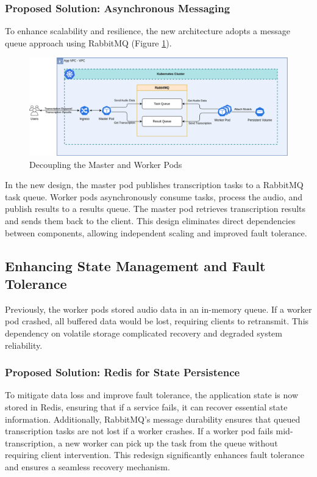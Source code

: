 \subsubsection{Proposed Solution: Asynchronous Messaging}
To enhance scalability and resilience, the new architecture adopts a message queue approach using RabbitMQ (Figure \ref{fig:decouple}).
\begin{figure}[!ht]
    \centering
    \includegraphics[width=\textwidth]{figures/decouple.drawio.png}
    \caption{Decoupling the Master and Worker Pods}
    \label{fig:decouple}
\end{figure}

In the new design, the master pod publishes transcription tasks to a RabbitMQ task queue. Worker pods asynchronously consume tasks, process the audio, and publish results to a results queue. The master pod retrieves transcription results and sends them back to the client. This design eliminates direct dependencies between components, allowing independent scaling and improved fault tolerance.

\subsection{Enhancing State Management and Fault Tolerance}
Previously, the worker pods stored audio data in an in-memory queue. If a worker pod crashed, all buffered data would be lost, requiring clients to retransmit. This dependency on volatile storage complicated recovery and degraded system reliability.

\subsubsection{Proposed Solution: Redis for State Persistence}
To mitigate data loss and improve fault tolerance, the application state is now stored in Redis, ensuring that if a service fails, it can recover essential state information. Additionally, RabbitMQ’s message durability ensures that queued transcription tasks are not lost if a worker crashes. If a worker pod fails mid-transcription, a new worker can pick up the task from the queue without requiring client intervention. This redesign significantly enhances fault tolerance and ensures a seamless recovery mechanism.


